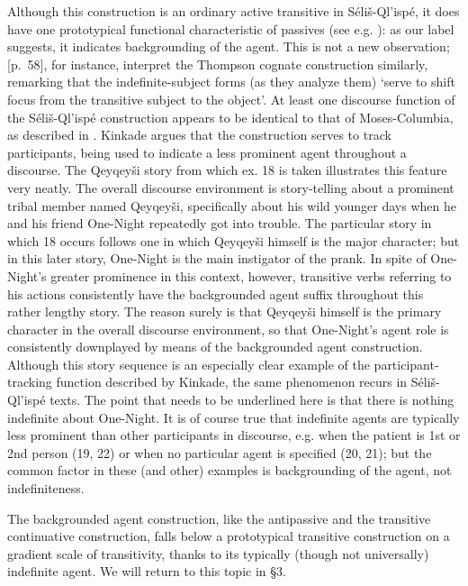 \documentclass[output=paper,colorlinks,citecolor=brown]{langscibook}
\begin{document}
Although this construction is an ordinary active transitive in
S\'eli\v{s}-Ql'isp\'e, it does have one prototypical functional
characteristic of passives (see e.g. \newline\cite{Shibatani:1985}): as our label
suggests, it indicates backgrounding of the agent.  This is not a new
observation; \cite{Thompson&Thompson:1992}[p.~58], for instance, interpret
the Thompson cognate construction similarly, remarking that the\newline
indefinite-subject forms (as they analyze them) `serve to shift focus
from the transitive subject to the object'.  At least one discourse
function of the S\'eli\v{s}-Ql'isp\'e construction appears to be
identical to that of Moses-Columbia, as described in \cite{Kinkade:1989}.
Kinkade argues that the construction serves to track participants,
being used to indicate a less prominent agent throughout a discourse.
The Qeyqey\v{s}i story from which ex.  18 is taken illustrates this
feature very neatly.  The overall discourse environment is
story-telling about a prominent tribal member named Qeyqey\v{s}i,
specifically about his wild younger days when he and his friend
One-Night repeatedly got into trouble.  The particular story in which
18 occurs follows one in which Qeyqey\v{s}i himself is the major
character; but in this later story, One-Night is the main instigator
of the prank.  In spite of One-Night's greater prominence in this
context, however, transitive verbs referring to his actions
consistently have the backgrounded agent suffix throughout this rather
lengthy story.  The reason surely is that Qeyqey\v{s}i himself is the
primary character in the overall discourse environment, so that
One-Night's agent role is consistently downplayed by means of the
backgrounded agent construction.  Although this story sequence is an
especially clear example of the participant-tracking function
described by Kinkade, the same phenomenon recurs in
S\'eli\v{s}-Ql'isp\'e texts.  The point that needs to be underlined
here is that there is nothing indefinite about One-Night.  It is of
course true that indefinite agents are typically less prominent than
other participants in discourse, e.g.  when the patient is 1st or 2nd
person (19, 22) or when no particular agent is specified (20, 21); but
the common factor in these (and other) examples is backgrounding of
the agent, not indefiniteness.

The backgrounded agent construction, like the antipassive and the
transitive continuative construction, falls below a prototypical
transitive construction on a gradient scale of transitivity, thanks to
its typically (though not universally) indefinite agent.  We will
return to this topic in \S 3.
\end{document}
